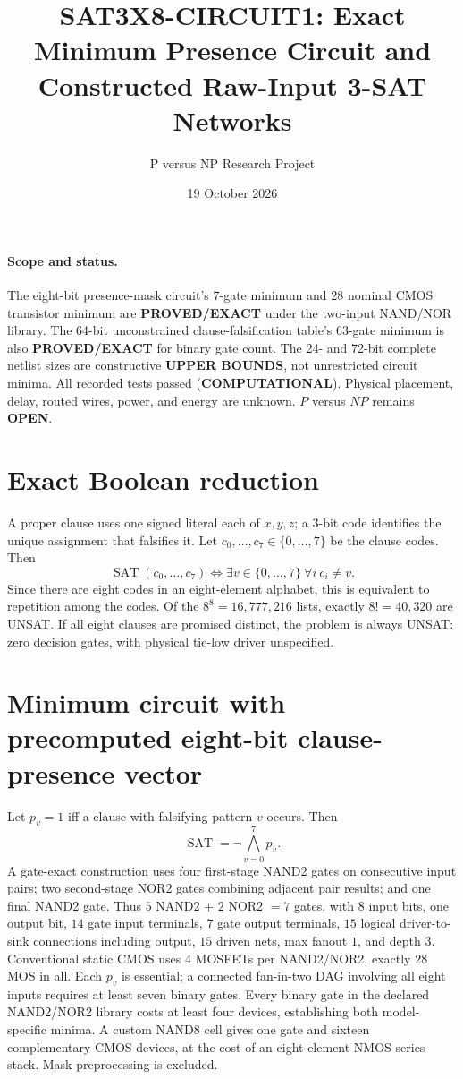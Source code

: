 \documentclass[11pt]{article}
\title{SAT3X8-CIRCUIT1: Exact Minimum Presence Circuit and Constructed Raw-Input 3-SAT Networks}
\author{P versus NP Research Project}
\date{19 October 2026}
\begin{document}
\maketitle

\paragraph{Scope and status.} The eight-bit presence-mask circuit's 7-gate minimum and 28 nominal CMOS transistor minimum are \textbf{PROVED/EXACT} under the two-input NAND/NOR library. The 64-bit unconstrained clause-falsification table's 63-gate minimum is also \textbf{PROVED/EXACT} for binary gate count. The 24- and 72-bit complete netlist sizes are constructive \textbf{UPPER BOUNDS}, not unrestricted circuit minima. All recorded tests passed (\textbf{COMPUTATIONAL}). Physical placement, delay, routed wires, power, and energy are unknown. $P$ versus $NP$ remains \textbf{OPEN}.

\section*{Exact Boolean reduction}
A proper clause uses one signed literal each of $x,y,z$; a 3-bit code identifies the unique assignment that falsifies it. Let $c_0,\ldots,c_7\in\{0,\ldots,7\}$ be the clause codes. Then
\[
\operatorname{SAT}(c_0,\ldots,c_7)
\iff \exists v\in\{0,\ldots,7\}\ \forall i\ c_i\ne v.
\]
Since there are eight codes in an eight-element alphabet, this is equivalent to repetition among the codes. Of the $8^8=16{,}777{,}216$ lists, exactly $8!=40{,}320$ are UNSAT. If all eight clauses are promised distinct, the problem is always UNSAT: zero decision gates, with physical tie-low driver unspecified.

\section*{Minimum circuit with precomputed eight-bit clause-presence vector}
Let $p_v=1$ iff a clause with falsifying pattern $v$ occurs. Then
\[
\operatorname{SAT}=\neg\bigwedge_{v=0}^7p_v.
\]
A gate-exact construction uses four first-stage NAND2 gates on consecutive input pairs; two second-stage NOR2 gates combining adjacent pair results; and one final NAND2 gate. Thus $5$ NAND2 + $2$ NOR2 $=7$ gates, with $8$ input bits, one output bit, $14$ gate input terminals, $7$ gate output terminals, $15$ logical driver-to-sink connections including output, $15$ driven nets, max fanout $1$, and depth $3$. Conventional static CMOS uses $4$ MOSFETs per NAND2/NOR2, exactly $28$ MOS in all. Each $p_v$ is essential; a connected fan-in-two DAG involving all eight inputs requires at least seven binary gates. Every binary gate in the declared NAND2/NOR2 library costs at least four devices, establishing both model-specific minima. A custom NAND8 cell gives one gate and sixteen complementary-CMOS devices, at the cost of an eight-element NMOS series stack. Mask preprocessing is excluded.
\end{document}
